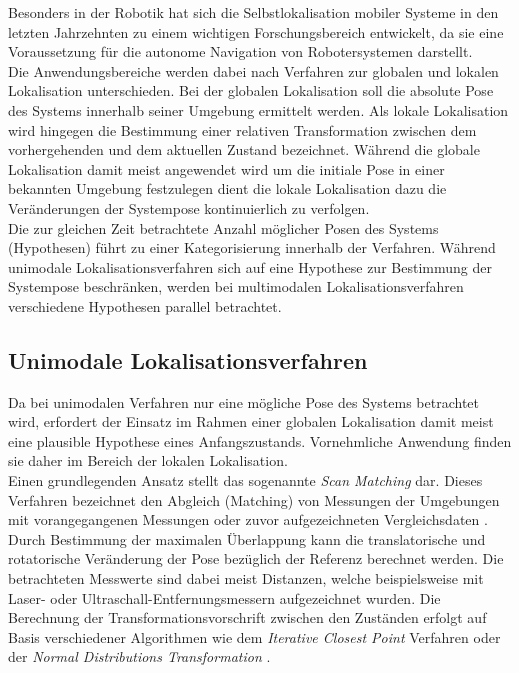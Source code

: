 Besonders in der Robotik hat sich die Selbstlokalisation mobiler Systeme in den letzten Jahrzehnten zu einem wichtigen Forschungsbereich entwickelt, da sie eine Voraussetzung für die autonome Navigation von Robotersystemen darstellt.\\
Die Anwendungsbereiche werden dabei nach Verfahren zur globalen und lokalen Lokalisation unterschieden. Bei der globalen Lokalisation soll die absolute Pose des Systems innerhalb seiner Umgebung ermittelt werden. Als lokale Lokalisation wird hingegen die Bestimmung einer relativen Transformation zwischen dem vorhergehenden und dem aktuellen Zustand bezeichnet. Während die globale Lokalisation damit meist angewendet wird um die initiale Pose in einer bekannten Umgebung festzulegen dient die lokale Lokalisation dazu die Veränderungen der Systempose kontinuierlich zu verfolgen.\\

Die zur gleichen Zeit betrachtete Anzahl möglicher Posen des Systems (Hypothesen) führt zu einer Kategorisierung innerhalb der Verfahren. Während unimodale Lokalisationsverfahren sich auf eine Hypothese zur Bestimmung der Systempose beschränken, werden bei multimodalen Lokalisationsverfahren verschiedene Hypothesen parallel betrachtet.
\subsection{Unimodale Lokalisationsverfahren}
\label{chap.unimod}
Da bei unimodalen Verfahren nur eine mögliche Pose des Systems betrachtet wird, erfordert der Einsatz im Rahmen einer globalen Lokalisation damit meist eine  plausible Hypothese eines Anfangszustands. Vornehmliche Anwendung finden sie daher im Bereich der lokalen Lokalisation.\\

Einen grundlegenden Ansatz stellt das sogenannte \textit{Scan Matching} dar. Dieses Verfahren bezeichnet den Abgleich (Matching) von Messungen der Umgebungen mit vorangegangenen Messungen \cite{Gutmann1996} oder zuvor aufgezeichneten Vergleichsdaten \cite{Gutmann1998}. Durch Bestimmung der maximalen Überlappung kann die translatorische und rotatorische Veränderung der Pose bezüglich der Referenz berechnet werden. Die betrachteten Messwerte sind dabei meist Distanzen, welche beispielsweise mit Laser- \cite{Diosi2007} oder Ultraschall-Entfernungsmessern \cite{Burguera2005} aufgezeichnet wurden. Die Berechnung der Transformationsvorschrift zwischen den Zuständen erfolgt auf Basis verschiedener Algorithmen wie dem \textit{Iterative Closest Point} Verfahren \cite{Besl1992}\cite{Lu1994} oder der \textit{Normal Distributions Transformation} \cite{Biber2003}.\\

